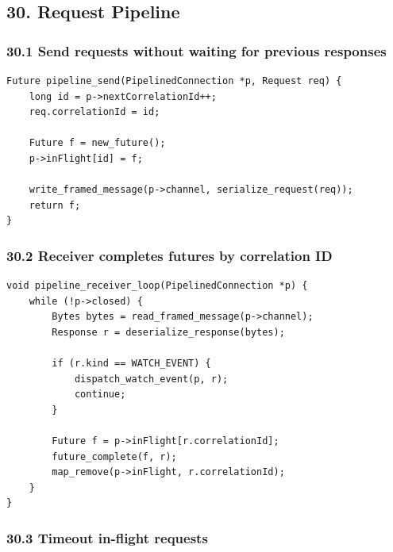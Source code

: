 \documentclass[10pt,letterpaper]{article}
\begin{document}
\subsection*{30. Request Pipeline}

\subsubsection*{30.1 Send requests without waiting for previous responses}

\begin{verbatim}
Future pipeline_send(PipelinedConnection *p, Request req) {
    long id = p->nextCorrelationId++;
    req.correlationId = id;

    Future f = new_future();
    p->inFlight[id] = f;

    write_framed_message(p->channel, serialize_request(req));
    return f;
}
\end{verbatim}

\subsubsection*{30.2 Receiver completes futures by correlation ID}

\begin{verbatim}
void pipeline_receiver_loop(PipelinedConnection *p) {
    while (!p->closed) {
        Bytes bytes = read_framed_message(p->channel);
        Response r = deserialize_response(bytes);

        if (r.kind == WATCH_EVENT) {
            dispatch_watch_event(p, r);
            continue;
        }

        Future f = p->inFlight[r.correlationId];
        future_complete(f, r);
        map_remove(p->inFlight, r.correlationId);
    }
}
\end{verbatim}

\subsubsection*{30.3 Timeout in-flight requests}
\end{document}
